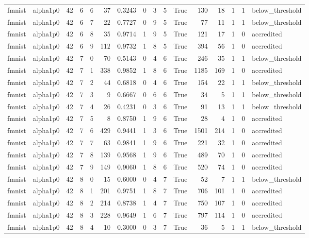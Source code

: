 \begin{tabular}{llrrrrrrrrrrrrrl}
fmnist & alpha1p0 & 42 & 6 & 6 & 37 & 0.3243 & 0 & 3 & 5 & True & 130 & 18 & 1 & 1 & below\_threshold \\
fmnist & alpha1p0 & 42 & 6 & 7 & 22 & 0.7727 & 0 & 9 & 5 & True & 77 & 11 & 1 & 1 & below\_threshold \\
fmnist & alpha1p0 & 42 & 6 & 8 & 35 & 0.9714 & 1 & 9 & 5 & True & 121 & 17 & 1 & 0 & accredited \\
fmnist & alpha1p0 & 42 & 6 & 9 & 112 & 0.9732 & 1 & 8 & 5 & True & 394 & 56 & 1 & 0 & accredited \\
fmnist & alpha1p0 & 42 & 7 & 0 & 70 & 0.5143 & 0 & 4 & 6 & True & 246 & 35 & 1 & 1 & below\_threshold \\
fmnist & alpha1p0 & 42 & 7 & 1 & 338 & 0.9852 & 1 & 8 & 6 & True & 1185 & 169 & 1 & 0 & accredited \\
fmnist & alpha1p0 & 42 & 7 & 2 & 44 & 0.6818 & 0 & 4 & 6 & True & 154 & 22 & 1 & 1 & below\_threshold \\
fmnist & alpha1p0 & 42 & 7 & 3 & 9 & 0.6667 & 0 & 6 & 6 & True & 34 & 5 & 1 & 1 & below\_threshold \\
fmnist & alpha1p0 & 42 & 7 & 4 & 26 & 0.4231 & 0 & 3 & 6 & True & 91 & 13 & 1 & 1 & below\_threshold \\
fmnist & alpha1p0 & 42 & 7 & 5 & 8 & 0.8750 & 1 & 9 & 6 & True & 28 & 4 & 1 & 0 & accredited \\
fmnist & alpha1p0 & 42 & 7 & 6 & 429 & 0.9441 & 1 & 3 & 6 & True & 1501 & 214 & 1 & 0 & accredited \\
fmnist & alpha1p0 & 42 & 7 & 7 & 63 & 0.9841 & 1 & 9 & 6 & True & 221 & 32 & 1 & 0 & accredited \\
fmnist & alpha1p0 & 42 & 7 & 8 & 139 & 0.9568 & 1 & 9 & 6 & True & 489 & 70 & 1 & 0 & accredited \\
fmnist & alpha1p0 & 42 & 7 & 9 & 149 & 0.9060 & 1 & 8 & 6 & True & 520 & 74 & 1 & 0 & accredited \\
fmnist & alpha1p0 & 42 & 8 & 0 & 15 & 0.6000 & 0 & 4 & 7 & True & 52 & 7 & 1 & 1 & below\_threshold \\
fmnist & alpha1p0 & 42 & 8 & 1 & 201 & 0.9751 & 1 & 8 & 7 & True & 706 & 101 & 1 & 0 & accredited \\
fmnist & alpha1p0 & 42 & 8 & 2 & 214 & 0.8738 & 1 & 4 & 7 & True & 750 & 107 & 1 & 0 & accredited \\
fmnist & alpha1p0 & 42 & 8 & 3 & 228 & 0.9649 & 1 & 6 & 7 & True & 797 & 114 & 1 & 0 & accredited \\
fmnist & alpha1p0 & 42 & 8 & 4 & 10 & 0.3000 & 0 & 3 & 7 & True & 36 & 5 & 1 & 1 & below\_threshold \\

\end{tabular}
